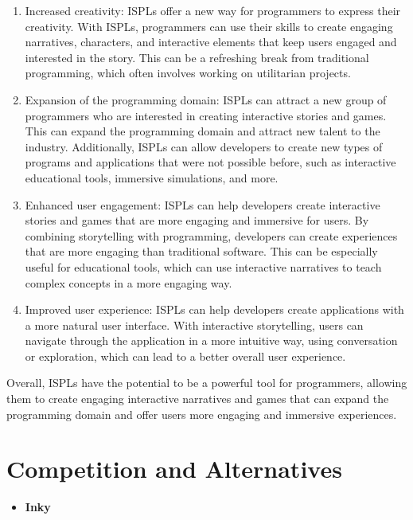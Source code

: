  \begin{enumerate}
                 \item Increased creativity: ISPLs offer a new way for programmers to express their creativity. With ISPLs, programmers can use their skills to create engaging narratives, characters, and interactive elements that keep users engaged and interested in the story. This can be a refreshing break from traditional programming, which often involves working on utilitarian projects.
                 \item Expansion of the programming domain: ISPLs can attract a new group of programmers who are interested in creating interactive stories and games. This can expand the programming domain and attract new talent to the industry. Additionally, ISPLs can allow developers to create new types of programs and applications that were not possible before, such as interactive educational tools, immersive simulations, and more.
                 \item Enhanced user engagement: ISPLs can help developers create interactive stories and games that are more engaging and immersive for users. By combining storytelling with programming, developers can create experiences that are more engaging than traditional software. This can be especially useful for educational tools, which can use interactive narratives to teach complex concepts in a more engaging way.
                 \item Improved user experience: ISPLs can help developers create applications with a more natural user interface. With interactive storytelling, users can navigate through the application in a more intuitive way, using conversation or exploration, which can lead to a better overall user experience.
 \end{enumerate}
 Overall, ISPLs have the potential to be a powerful tool for programmers, allowing them to create engaging interactive narratives and games that can expand the programming domain and offer users more engaging and immersive experiences.

\section{Competition and Alternatives}

 \begin{itemize}
                \item \textbf{Inky}
 \end{itemize}
 
